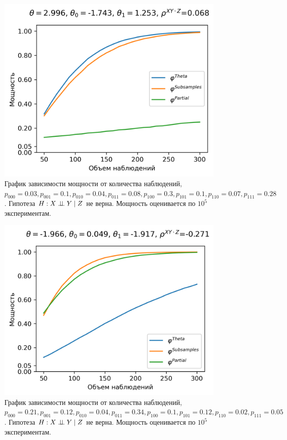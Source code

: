 \begin{figure}[H]
    \centering
    \includegraphics[scale=0.55]{images/graph6.png}
    \caption{График зависимости мощности от количества наблюдений,
    $p_{000}=0.03, p_{001}=0.1, 
    p_{010}=0.04, p_{011}=0.08,
    p_{100}=0.3, p_{101}=0.1, p_{110}=0.07, p_{111}=0.28$. 
    Гипотеза $H: X \perp\!\!\!\perp Y \mid Z$ не верна.
    Мощность оценивается по $10^5$ экспериментам.} \label{fig:6}
\end{figure}

\begin{figure}[H]
    \centering
    \includegraphics[scale=0.55]{images/graph7.png}
    \caption{График зависимости мощности от количества наблюдений,
    $p_{000}=0.21, p_{001}=0.12, 
    p_{010}=0.04, p_{011}=0.34,
    p_{100}=0.1, p_{101}=0.12, p_{110}=0.02, p_{111}=0.05$. 
    Гипотеза $H: X \perp\!\!\!\perp Y \mid Z$ не верна.
    Мощность оценивается по $10^5$ экспериментам.} \label{fig:7}
\end{figure}


